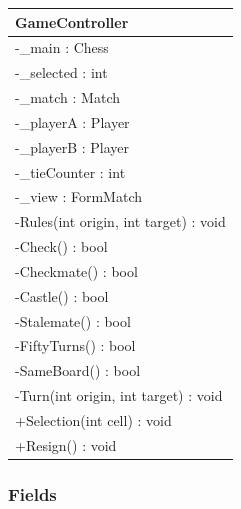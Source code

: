 \documentclass[12pt]{article}
\begin{document}
    \begin{table}[H]
        \begin{tabular}{|l|}
            \hline
            \rowcolor[HTML]{C0C0C0}
            \textbf{GameController}               \\ \hline
            \rowcolor[HTML]{EFEFEF}
            -\_main : Chess                       \\ \hline
            \rowcolor[HTML]{EFEFEF}
            -\_selected : int                     \\ \hline
            \rowcolor[HTML]{EFEFEF}
            -\_match : Match                      \\ \hline
            \rowcolor[HTML]{EFEFEF}
            -\_playerA : Player                   \\ \hline
            \rowcolor[HTML]{EFEFEF}
            -\_playerB : Player                   \\ \hline
            \rowcolor[HTML]{EFEFEF}
            -\_tieCounter : int                   \\ \hline
            \rowcolor[HTML]{EFEFEF}
            -\_view : FormMatch                   \\ \hline
            -Rules(int origin, int target) : void \\ \hline
            -Check() : bool                       \\ \hline
            -Checkmate() : bool                   \\ \hline
            -Castle() : bool                      \\ \hline
            -Stalemate() : bool                   \\ \hline
            -FiftyTurns() : bool                  \\ \hline
            -SameBoard() : bool                   \\ \hline
            -Turn(int origin, int target) : void  \\ \hline
            +Selection(int cell) : void           \\ \hline
            +Resign() : void                      \\ \hline
        \end{tabular}
    \end{table}

    \subsubsection{Fields}
\end{document}
